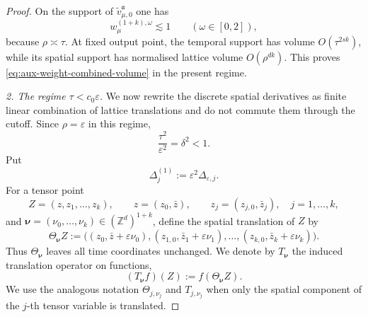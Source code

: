 \documentclass{article}
\numberwithin{equation}{section}
\newcommand{\assign}{:=}
\theoremstyle{plain}
\theoremstyle{definition}
\begin{document}
\begin{proof}
	On the support of $\tilde v_{\mu,0}^{\mathfrak a}$ one has
	\[
	w_\mu^{(1+k),\omega}\lesssim1
	\qquad(\omega\in[0,2]),
	\]
	because $\rho\asymp\tau$. At fixed output point, the temporal support has
	volume $O(\tau^{2sk})$, while its spatial support has normalised lattice
	volume $O(\rho^{dk})$. This proves
	\eqref{eq:aux-weight-combined-volume} in the present regime.
	
	\smallskip
	\noindent\emph{2. The regime $\tau<c_0\varepsilon$.}
	We now rewrite the discrete spatial derivatives as finite linear combination of lattice translations and do not commute them through the cutoff. Since $\rho=\varepsilon$ in this regime,
	\[
	\frac{\tau^2}{\varepsilon^2}=\delta^2<1.
	\]
	Put
	\[
	\Delta_j^{(1)}\assign\varepsilon^2\Delta_{\varepsilon,j}.
	\]
		For a tensor point
		\[
		Z=(z,z_1,\ldots,z_k),
		\qquad
		z=(z_0,\bar z),
		\qquad
		z_j=(z_{j,0},\bar z_j),\quad j=1,\ldots,k,
		\]
		and
		\(\boldsymbol\nu=(\nu_0,\ldots,\nu_k)\in(\mathbb Z^d)^{1+k}\),
		define the spatial translation of \(Z\) by
		\[
		\Theta_{\boldsymbol\nu}Z
		\assign
		\bigl(
		(z_0,\bar z+\varepsilon\nu_0),
	(z_{1,0},\bar z_1+\varepsilon\nu_1),
	\ldots,
	(z_{k,0},\bar z_k+\varepsilon\nu_k)
	\bigr).
	\]
	Thus \(\Theta_{\boldsymbol\nu}\) leaves all time coordinates unchanged.  We
	denote by \(T_{\boldsymbol\nu}\) the induced translation operator on
	functions,
		\begin{equation}
			\label{eq:aux-weight-combined-translation-convention}
			(T_{\boldsymbol\nu}f)(Z)
			\assign
			f(\Theta_{\boldsymbol\nu}Z).
		\end{equation}
	We use the analogous notation
	\(\Theta_{j,\nu_j}\) and \(T_{j,\nu_j}\) when only the spatial component
	of the \(j\)-th tensor variable is translated.
	

\end{proof}
\end{document}
